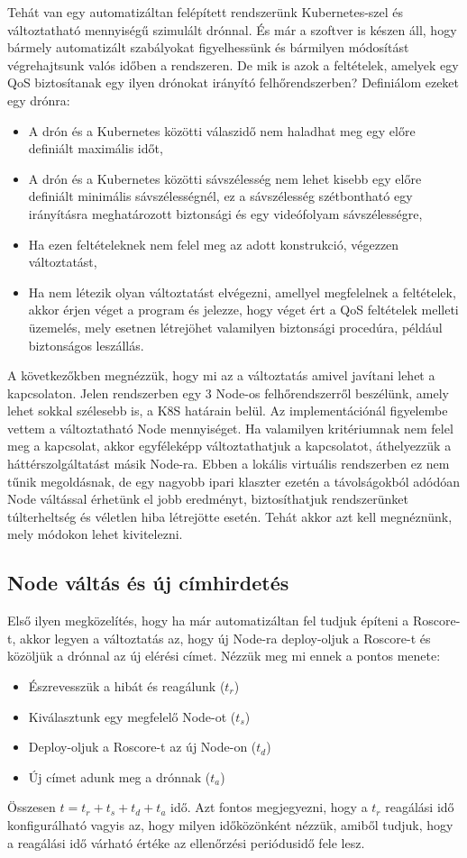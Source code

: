 Tehát van egy automatizáltan felépített rendszerünk Kubernetes-szel és változtatható mennyiségű szimulált drónnal. És már a szoftver is készen áll, hogy bármely automatizált szabályokat figyelhessünk és bármilyen módosítást végrehajtsunk valós időben a rendszeren. De mik is azok a feltételek, amelyek egy QoS biztosítanak egy ilyen drónokat irányító felhőrendszerben? Definiálom ezeket egy drónra:
\begin{itemize}
	\item A drón és a Kubernetes közötti válaszidő nem haladhat meg egy előre definiált maximális időt,
	\item A drón és a Kubernetes közötti sávszélesség nem lehet kisebb egy előre definiált minimális sávszélességnél, ez a sávszélesség szétbontható egy irányításra meghatározott biztonsági és egy videófolyam sávszélességre,
	\item Ha ezen feltételeknek nem felel meg az adott konstrukció, végezzen változtatást,
	\item Ha nem létezik olyan változtatást elvégezni, amellyel megfelelnek a feltételek, akkor érjen véget a program és jelezze, hogy véget ért a QoS feltételek melleti üzemelés, mely esetnen létrejöhet valamilyen biztonsági procedúra, például biztonságos leszállás.
\end{itemize}

\noindent
A következőkben megnézzük, hogy mi az a változtatás amivel javítani lehet a kapcsolaton. Jelen rendszerben egy 3 Node-os felhőrendszerről beszélünk, amely lehet sokkal szélesebb is, a K8S határain belül. Az implementációnál figyelembe vettem a változtatható Node mennyiséget. Ha valamilyen kritériumnak nem felel meg a kapcsolat, akkor egyféleképp változtathatjuk a kapcsolatot, áthelyezzük a háttérszolgáltatást másik Node-ra. Ebben a lokális virtuális rendszerben ez nem tűnik megoldásnak, de egy nagyobb ipari klaszter ezetén a távolságokból adódóan Node váltással érhetünk el jobb eredményt, biztosíthatjuk rendszerünket túlterheltség és véletlen hiba létrejötte esetén. Tehát akkor azt kell megnéznünk, mely módokon lehet kivitelezni.

\subsection{Node váltás és új címhirdetés}
Első ilyen megközelítés, hogy ha már automatizáltan fel tudjuk építeni a Roscore-t, akkor legyen a változtatás az, hogy új Node-ra deploy-oljuk a Roscore-t és közöljük a drónnal az új elérési címet. Nézzük meg mi ennek a pontos menete:
\begin{itemize}
	\item Észrevesszük a hibát és reagálunk ($t_{r}$)
	\item Kiválasztunk egy megfelelő Node-ot ($t_{s}$)
	\item Deploy-oljuk a Roscore-t az új Node-on ($t_{d}$)
	\item Új címet adunk meg a drónnak ($t_{a}$)
\end{itemize}
Összesen $t = t_r + t_s + t_d + t_a$ idő. Azt fontos megjegyezni, hogy a $t_r$ reagálási idő konfigurálható vagyis az, hogy milyen időközönként nézzük, amiből tudjuk, hogy a reagálási idő várható értéke az ellenőrzési periódusidő fele lesz.

